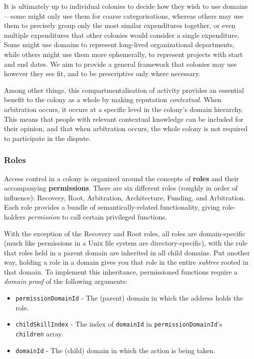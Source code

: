 It is ultimately up to individual colonies to decide how they wish to use domains—some might only use them for coarse categorisations, whereas others may use them to precisely group only the most similar expenditures together, or even multiple expenditures that other colonies would consider a single expenditure. Some might use domains to represent long-lived organizational departments, while others might use them more ephemerally, to represent projects with start and end dates. We aim to provide a general framework that colonies may use however they see fit, and to be prescriptive only where necessary.

Among other things, this compartmentalisation of activity provides an essential benefit to the colony as a whole by making reputation \textit{contextual}. When arbitration occurs, it occurs at a specific level in the colony's domain hierarchy. This means that people with relevant contextual knowledge can be included for their opinion, and that when arbitration occurs, the whole colony is not required to participate in the dispute.

\subsubsection{Roles}

Access control in a colony is organized around the concepts of \textbf{roles} and their accompanying \textbf{permissions}. There are six different roles (roughly in order of influence): Recovery, Root, Arbitration, Architecture, Funding, and Arbitration. Each role provides a bundle of semantically-related functionality, giving role-holders \textit{permission} to call certain privileged functions.

With the exception of the Recovery and Root roles, all roles are domain-specific (much like permissions in a Unix file system are directory-specific), with the rule that roles held in a parent domain are inherited in all child domains. Put another way, holding a role in a domain gives you that role in the entire \textit{subtree} rooted in that domain. To implement this inheritance, permissioned functions require a \textit{domain proof} of the following arguments:

\begin{itemize}
\item \texttt{permissionDomainId} - The (parent) domain in which the address holds the role.
\item \texttt{childSkillIndex} - The index of \texttt{domainId} in \texttt{permissionDomainId}'s \texttt{children} array.
\item \texttt{domainId} - The (child) domain in which the action is being taken.
\end{itemize}

